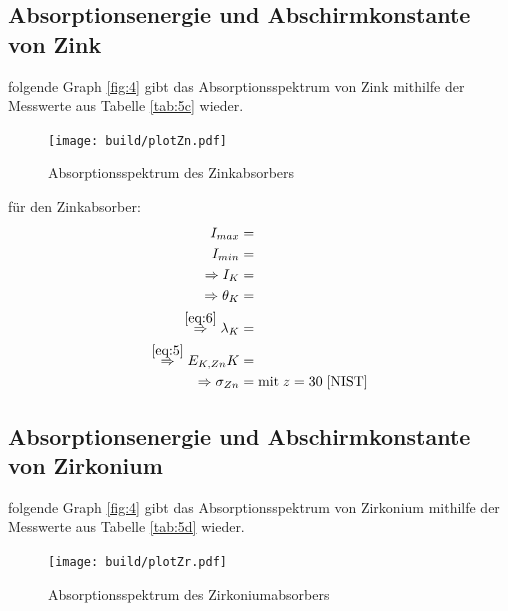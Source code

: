 \subsection{Absorptionsenergie und Abschirmkonstante von Zink}

    \justifying folgende Graph \ref{fig:4} gibt das Absorptionsspektrum von Zink mithilfe der Messwerte aus Tabelle \ref{tab:5c} 
    wieder.

    \begin{figure}[H]
        \centering
        \texttt{[image: build/plotZn.pdf]}
        \caption{Absorptionsspektrum des Zinkabsorbers}
        \label{fig:8}
    \end{figure}

    \justifying für den Zinkabsorber:
    \begin{subequations}\label{eq:25}
    \begin{align}
        I_{max} &= \text{} \label{eq:25a}\\
        I_{min} &= \text{} \label{eq:25b}\\
        \Rightarrow I_K &= \text{} \label{eq:25c}\\
        \Rightarrow \theta_K &= \text{} \label{eq:25d}\\
        \stackrel{\eqref{eq:6}}{\Rightarrow} \lambda_K &= \text{} \label{eq:25e}\\
        \stackrel{\eqref{eq:5}}{\Rightarrow} E_{K,Zn}K &= \text{} \label{eq:25f}\\
        \Rightarrow \sigma_{Zn} &= \text{} \text{mit}\; z=30\; \text{\cite{NIST}} \label{eq:25g}
    \end{align}
    \end{subequations}

\subsection{Absorptionsenergie und Abschirmkonstante von Zirkonium}

    \justifying folgende Graph \ref{fig:4} gibt das Absorptionsspektrum von Zirkonium mithilfe der Messwerte aus Tabelle \ref{tab:5d} 
    wieder.

    \begin{figure}[H]
        \centering
        \texttt{[image: build/plotZr.pdf]}
        \caption{Absorptionsspektrum des Zirkoniumabsorbers}
        \label{fig:9}
    \end{figure}

